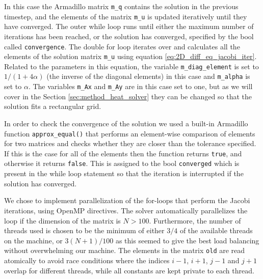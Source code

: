\documentclass[reprint,english,notitlepage]{revtex4-1}  %
\begin{document}
In this case the Armadillo matrix \verb+m_q+ contains the solution in the previous timestep, and the elements of the matrix \verb+m_u+ is updated iteratively until they have converged. The outer while loop runs until either the maximum number of iterations has been reached, or the solution has converged, specified by the bool called \verb+convergence+. The double for loop iterates over and calculates all the elements of the solution matrix \verb+m_u+ using equation \eqref{eq:2D_diff_eq_jacobi_iter}. Related to the parameters in this equation, the variable \verb+m_diag_element+ is set to $1/(1 + 4\alpha)$ (the inverse of the diagonal elements) in this case and \verb+m_alpha+ is set to $\alpha$. The variables \verb+m_Ax+ and \verb+m_Ay+ are in this case set to one, but as we will cover in the Section \ref{sec:method_heat_solver} they can be changed so that the solution fits a rectangular grid. 

In order to check the convergence of the solution we used a built-in Armadillo function \verb+approx_equal()+ that performs an element-wise comparison of elements for two matrices and checks whether they are closer than the tolerance specified. If this is the case for all of the elements then the function returns \verb+true+, and otherwise it returns \verb+false+. This is assigned to the bool \verb+converged+ which is present in the while loop statement so that the iteration is interrupted if the solution has converged.

We chose to implement parallelization of the for-loops that perform the Jacobi iterations, using OpenMP directives. The solver automatically parallelizes the loop if the dimension of the matrix is \(N > 100\). Furthermore, the number of threads used is chosen to be the minimum of either \(3/4\) of the available threads on the machine, or \(3(N+1)/100\) as this seemed to give the best load balancing without overwhelming our machine. The elements in the matrix \verb+old+ are read atomically to avoid race conditions where the indices \(i-1\), \(i+1\), \(j-1\) and \(j+1\) overlap for different threads, while all constants are kept private to each thread.

\end{document}
